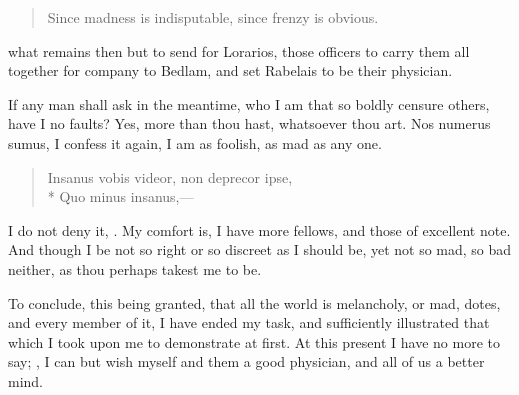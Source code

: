 {\begin{quote}
Since madness is indisputable, since frenzy is obvious.
\end{quote}

what remains then but to send for Lorarios, those officers to
carry them all together for company to Bedlam, and set Rabelais to be
their physician.

If any man shall ask in the meantime, who I am that so boldly censure
others,  have I no faults? Yes, more than
thou hast, whatsoever thou art. Nos numerus sumus, I confess it again,
I am as foolish, as mad as any one.

\begin{verse}
\textlatin{Insanus vobis videor, non deprecor ipse,}\\*
\textlatin{Quo minus insanus,}---
\end{verse}

I do not deny it, . My comfort is, I have more
fellows, and those of excellent note. And though I be not so right or
so discreet as I should be, yet not so mad, so bad neither, as thou
perhaps takest me to be.

To conclude, this being granted, that all the world is melancholy, or
mad, dotes, and every member of it, I have ended my task, and
sufficiently illustrated that which I took upon me to demonstrate at
first. At this present I have no more to say; , I can but wish myself and them a good physician, and all of
us a better mind.

}
